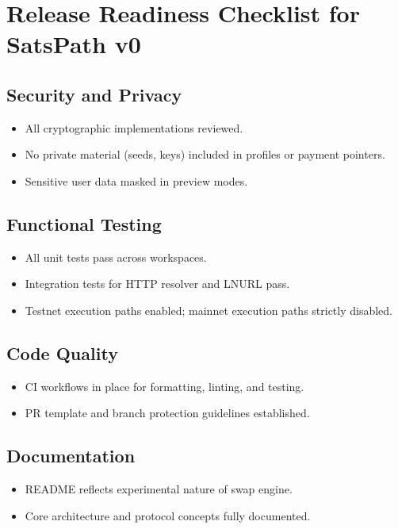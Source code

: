 \documentclass[
]{article}
\author{}
\date{}
\providecommand{\tightlist}{%
  \setlength{\itemsep}{0pt}\setlength{\parskip}{0pt}}
\begin{document}
\hypertarget{release-readiness-checklist-for-satspath-v0}{%
\section{Release Readiness Checklist for SatsPath
v0}\label{release-readiness-checklist-for-satspath-v0}}

\hypertarget{security-and-privacy}{%
\subsection{Security and Privacy}\label{security-and-privacy}}

\begin{itemize}
\tightlist
\item[$\boxtimes$]
  All cryptographic implementations reviewed.
\item[$\boxtimes$]
  No private material (seeds, keys) included in profiles or payment
  pointers.
\item[$\boxtimes$]
  Sensitive user data masked in preview modes.
\end{itemize}

\hypertarget{functional-testing}{%
\subsection{Functional Testing}\label{functional-testing}}

\begin{itemize}
\tightlist
\item[$\boxtimes$]
  All unit tests pass across workspaces.
\item[$\boxtimes$]
  Integration tests for HTTP resolver and LNURL pass.
\item[$\boxtimes$]
  Testnet execution paths enabled; mainnet execution paths strictly
  disabled.
\end{itemize}

\hypertarget{code-quality}{%
\subsection{Code Quality}\label{code-quality}}

\begin{itemize}
\tightlist
\item[$\boxtimes$]
  CI workflows in place for formatting, linting, and testing.
\item[$\boxtimes$]
  PR template and branch protection guidelines established.
\end{itemize}

\hypertarget{documentation}{%
\subsection{Documentation}\label{documentation}}

\begin{itemize}
\tightlist
\item[$\boxtimes$]
  README reflects experimental nature of swap engine.
\item[$\boxtimes$]
  Core architecture and protocol concepts fully documented.
\end{itemize}
\end{document}
